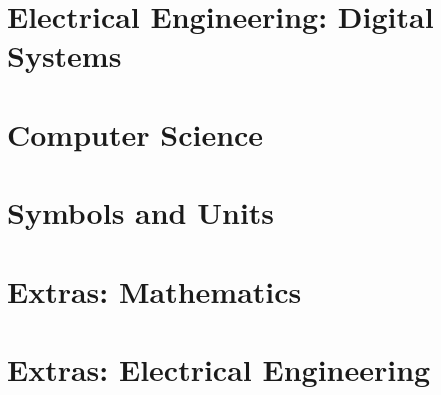 \documentclass{article}
\begin{document}
\newpage
\section{Electrical Engineering: Digital Systems}
\label{sec:ee-digital}

    {  }
    \newpage
    {  }

\newpage
\section{Computer Science}
\label{sec:compsci}

    {  }

\newpage
\section{Symbols and Units}
\label{sec:units}

    {  }

\newpage
{}

\section{Extras: Mathematics}%
\label{sec:extrasec-math}

    {  }

\newpage
\section{Extras: Electrical Engineering}%
\label{sec:extrasec-ee}

    {  }
\end{document}
